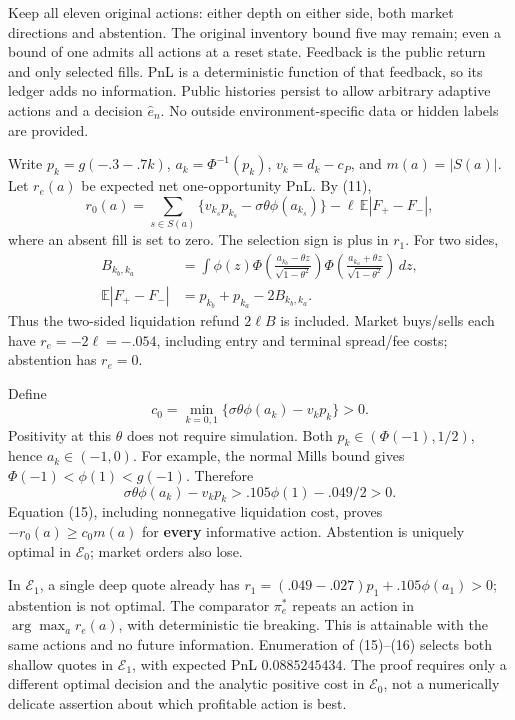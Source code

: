 \documentclass[
  10pt,
  a4paper,
]{article}
\begin{document}
Keep all eleven original actions: either depth on either side, both
market directions and abstention. The original inventory bound five may
remain; even a bound of one admits all actions at a reset state.
Feedback is the public return and only selected fills. PnL is a
deterministic function of that feedback, so its ledger adds no
information. Public histories persist to allow arbitrary adaptive
actions and a decision \(\widehat e_n\). No outside environment-specific
data or hidden labels are provided.

Write \(p_k=g(-.3-.7k)\), \(a_k=\Phi^{-1}(p_k)\), \(v_k=d_k-c_P\), and
\(m(a)=|S(a)|\). Let \(r_e(a)\) be expected net one-opportunity PnL. By
(11), \[
r_0(a)=
\sum_{s\in S(a)}\{v_{k_s}p_{k_s}-\sigma\theta\phi(a_{k_s})\}
-\ell\,\mathbb E|F_+-F_-|,
\tag{15}
\] where an absent fill is set to zero. The selection sign is plus in
\(r_1\). For two sides, \[
\begin{aligned}
B_{k_b,k_a}
&=\int\phi(z)
\Phi\!\left(\frac{a_{k_b}-\theta z}{\sqrt{1-\theta^2}}\right)
\Phi\!\left(\frac{a_{k_a}+\theta z}{\sqrt{1-\theta^2}}\right)\,dz,\\
\mathbb E|F_+-F_-|&=p_{k_b}+p_{k_a}-2B_{k_b,k_a}.
\end{aligned}
\tag{16}
\] Thus the two-sided liquidation refund \(2\ell B\) is included. Market
buys/sells each have \(r_e=-2\ell=-.054\), including entry and terminal
spread/fee costs; abstention has \(r_e=0\).

Define \[
c_0=\min_{k=0,1}\{\sigma\theta\phi(a_k)-v_kp_k\}>0.
\tag{17}
\] Positivity at this \(\theta\) does not require simulation. Both
\(p_k\in(\Phi(-1),1/2)\), hence \(a_k\in(-1,0)\). For example, the
normal Mills bound gives \(\Phi(-1)<\phi(1)<g(-1)\). Therefore \[
\sigma\theta\phi(a_k)-v_kp_k
>.105\phi(1)-.049/2>0.
\] Equation (15), including nonnegative liquidation cost, proves
\(-r_0(a)\ge c_0m(a)\) for \textbf{every} informative action. Abstention
is uniquely optimal in \(\mathcal E_0\); market orders also lose.

In \(\mathcal E_1\), a single deep quote already has
\(r_1=(.049-.027)p_1+.105\phi(a_1)>0\); abstention is not optimal. The
comparator \(\pi_e^*\) repeats an action in \(\arg\max_a r_e(a)\), with
deterministic tie breaking. This is attainable with the same actions and
no future information. Enumeration of (15)--(16) selects both shallow
quotes in \(\mathcal E_1\), with expected PnL \(0.0885245434\). The
proof requires only a different optimal decision and the analytic
positive cost in \(\mathcal E_0\), not a numerically delicate assertion
about which profitable action is best.
\end{document}
